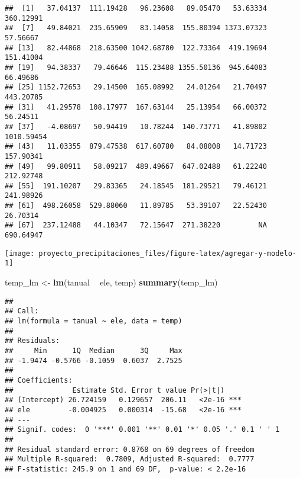 \documentclass[11pt,]{article}
\newenvironment{Shaded}{\begin{snugshade}}{\end{snugshade}}
\newcommand{\KeywordTok}[1]{\textcolor[rgb]{0.13,0.29,0.53}{\textbf{#1}}}
\newcommand{\StringTok}[1]{\textcolor[rgb]{0.31,0.60,0.02}{#1}}
\newcommand{\CommentTok}[1]{\textcolor[rgb]{0.56,0.35,0.01}{\textit{#1}}}
\newcommand{\OperatorTok}[1]{\textcolor[rgb]{0.81,0.36,0.00}{\textbf{#1}}}
\newcommand{\NormalTok}[1]{#1}
\begin{document}
\begin{verbatim}
##  [1]   37.04137  111.19428   96.23608   89.05470   53.63334  360.12991
##  [7]   49.84021  235.65909   83.14058  155.80394 1373.07323   57.56667
## [13]   82.44868  218.63500 1042.68780  122.73364  419.19694  151.41004
## [19]   94.38337   79.46646  115.23488 1355.50136  945.64083   66.49686
## [25] 1152.72653   29.14500  165.08992   24.01264   21.70497  443.20785
## [31]   41.29578  108.17977  167.63144   25.13954   66.00372   56.24511
## [37]   -4.08697   50.94419   10.78244  140.73771   41.89802 1010.59454
## [43]   11.03355  879.47538  617.60780   84.08008   14.71723  157.90341
## [49]   99.80911   58.09217  489.49667  647.02488   61.22240  212.92748
## [55]  191.10207   29.83365   24.18545  181.29521   79.46121  241.98926
## [61]  498.26058  529.88060   11.89785   53.39107   22.52430   26.70314
## [67]  237.12488   44.10347   72.15647  271.38220         NA  690.64947
\end{verbatim}

\begin{Shaded}
\end{Shaded}

\texttt{[image: proyecto\_precipitaciones\_files/figure-latex/agregar-y-modelo-1]}

\begin{Shaded}
\begin{Highlighting}[]
\NormalTok{temp_lm <-}\StringTok{ }\KeywordTok{lm}\NormalTok{(tanual }\OperatorTok{~}\StringTok{ }\NormalTok{ele, temp)}
\KeywordTok{summary}\NormalTok{(temp_lm)}
\end{Highlighting}
\end{Shaded}

\begin{verbatim}
## 
## Call:
## lm(formula = tanual ~ ele, data = temp)
## 
## Residuals:
##     Min      1Q  Median      3Q     Max 
## -1.9474 -0.5766 -0.1059  0.6037  2.7525 
## 
## Coefficients:
##              Estimate Std. Error t value Pr(>|t|)    
## (Intercept) 26.724159   0.129657  206.11   <2e-16 ***
## ele         -0.004925   0.000314  -15.68   <2e-16 ***
## ---
## Signif. codes:  0 '***' 0.001 '**' 0.01 '*' 0.05 '.' 0.1 ' ' 1
## 
## Residual standard error: 0.8768 on 69 degrees of freedom
## Multiple R-squared:  0.7809, Adjusted R-squared:  0.7777 
## F-statistic: 245.9 on 1 and 69 DF,  p-value: < 2.2e-16
\end{verbatim}
\end{document}
